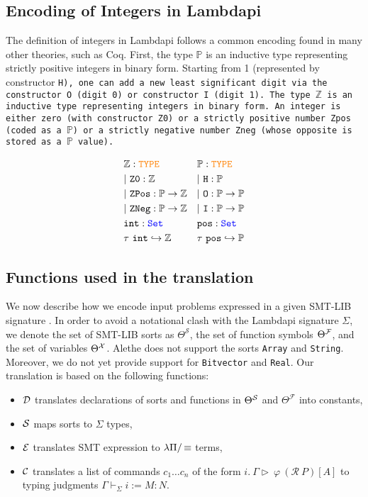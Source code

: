 \subsection{Encoding of Integers in Lambdapi}

The definition of integers in Lambdapi follows a common encoding found in many other theories, such as Coq.
First, the type $\mathbb{P}$  is an inductive type representing strictly positive integers in binary form.
Starting from 1 (represented by constructor \tt{H}), one can add a new least significant digit via the constructor \tt{O} (digit 0) or constructor \tt{I} (digit 1). 
The type $\mathbb{Z}$ is an inductive type representing integers in binary form.
An integer is either zero (with constructor \tt{Z0}) or a strictly positive number \tt{Zpos} (coded as a $\mathbb{P}$) or a strictly negative number \tt{Zneg} (whose opposite is stored as a $\mathbb{P}$ value).

\begin{align*}
&\mathbb{Z}: \type & &\mathbb{P}: \type \\
&|~\tt{Z0}: \mathbb{Z} & &|~\tt{H} : \mathbb{P} \\
&|~\tt{ZPos}: \mathbb{P} \ra \mathbb{Z} & &|~\tt{O}: \mathbb{P} \ra \mathbb{P} \\
&|~\tt{ZNeg}: \mathbb{P} \ra \mathbb{Z} & &|~\tt{I}: \mathbb{P} \ra \mathbb{P} \\
&\tt{int}: \set & &\tt{pos}: \set \\
&\tau~\tt{int} \re \mathbb{Z} & &\tau~\tt{pos} \re \mathbb{P} \\
\end{align*}


\subsection{Functions used in the translation}

We now describe how we encode input problems expressed in a given
SMT-LIB signature \cite[\S 5.2.1]{smtlib}. In order to avoid a notational clash with the Lambdapi signature $\Sigma$, we denote the set of SMT-LIB sorts as $\Theta^\mathcal{S}$, the set of function symbols $\Theta^\cal{F}$, and the set of variables $\Theta^\cal{X}$.
Alethe does not support the sorts \texttt{Array} and \texttt{String}. Moreover, we do not yet provide support for \texttt{Bitvector} and \texttt{Real}. Our translation is based on the following functions:
\begin{itemize}
\item $\cal{D}$ translates declarations of sorts and functions in $\Theta^\cal{S}$ and $\Theta^\mathcal{F}$ into constants,
\item $\cal{S}$ maps sorts to $\Sigma$ types,
\item $\cal{E}$ translates SMT expression to $\lpm$ terms,
\item $\cal{C}$ translates a list of commands  $c_1 \dots c_n$ of the form $i.~\Gamma \triangleright~\varphi~(\mathcal{R}~P)[A]$ to typing judgments $\Gamma \vdash_\Sigma i := M: N$.
\end{itemize}

